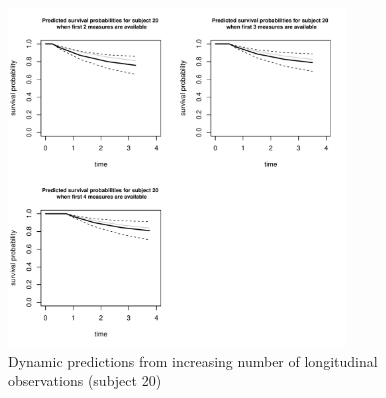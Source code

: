 \documentclass{article}
\begin{document}
\begin{figure}[H]
\centering
\includegraphics[width=0.8\textwidth]{data42sub20_t1_t3.pdf}
\caption{Dynamic predictions from increasing number of longitudinal observations (subject 20)}
\end{figure}

\end{document}
